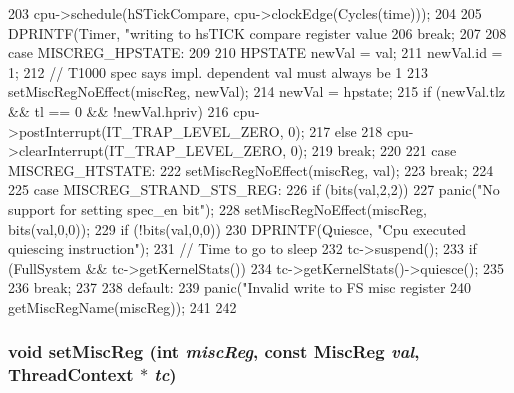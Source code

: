 \begin{DoxyCode}
{{{203             cpu->schedule(hSTickCompare, cpu->clockEdge(Cycles(time)));
204         }
205         DPRINTF(Timer, "writing to hsTICK compare register value %
206         break;
207 
208       case MISCREG_HPSTATE:
209         {
210             HPSTATE newVal = val;
211             newVal.id = 1;
212             // T1000 spec says impl. dependent val must always be 1
213             setMiscRegNoEffect(miscReg, newVal);
214             newVal = hpstate;
215             if (newVal.tlz && tl == 0 && !newVal.hpriv)
216                 cpu->postInterrupt(IT_TRAP_LEVEL_ZERO, 0);
217             else
218                 cpu->clearInterrupt(IT_TRAP_LEVEL_ZERO, 0);
219             break;
220         }
221       case MISCREG_HTSTATE:
222         setMiscRegNoEffect(miscReg, val);
223         break;
224 
225       case MISCREG_STRAND_STS_REG:
226         if (bits(val,2,2))
227             panic("No support for setting spec_en bit\n");
228         setMiscRegNoEffect(miscReg, bits(val,0,0));
229         if (!bits(val,0,0)) {
230             DPRINTF(Quiesce, "Cpu executed quiescing instruction\n");
231             // Time to go to sleep
232             tc->suspend();
233             if (FullSystem && tc->getKernelStats())
234                 tc->getKernelStats()->quiesce();
235         }
236         break;
237 
238       default:
239         panic("Invalid write to FS misc register %
240               getMiscRegName(miscReg));
241     }
242 }
\end{DoxyCode}
\hypertarget{classSparcISA_1_1ISA_a74734f9fecafa198d6a4881f65992ee3}{
\subsubsection[{setMiscReg}]{\setlength{\rightskip}{0pt plus 5cm}void setMiscReg (int {\em miscReg}, \/  const {\bf MiscReg} {\em val}, \/  {\bf ThreadContext} $\ast$ {\em tc})}}
\label{classSparcISA_1_1ISA_a74734f9fecafa198d6a4881f65992ee3}



